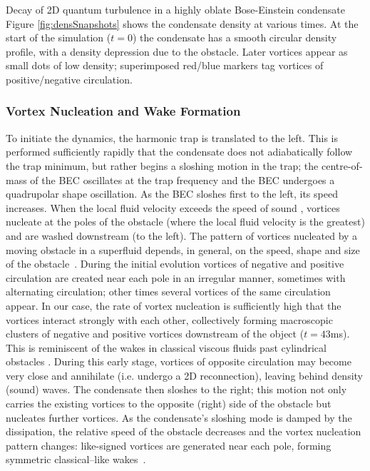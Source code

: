 \begin{chapter}{\label{cha:shin}Decay of 2D quantum turbulence in a highly oblate Bose-Einstein condensate}
Figure \ref{fig:densSnapshots} shows the condensate density at various times. At the start of the simulation ($t=0$) the condensate has a smooth circular density profile, with a density depression due to the obstacle.  Later vortices appear as small dots of low density; superimposed red/blue markers tag vortices of positive/negative circulation.

\subsubsection{Vortex Nucleation and Wake Formation}

To initiate the dynamics, the harmonic trap is translated to the left.  This is performed sufficiently rapidly that the condensate does not adiabatically follow the trap minimum, but rather begins a sloshing motion in the trap; the centre-of-mass of the BEC oscillates at the trap frequency and the BEC undergoes a quadrupolar shape oscillation.  As the BEC sloshes first to the left, its speed increases.  When the local fluid velocity exceeds the speed of sound \cite{frisch92}, vortices nucleate at the poles of the obstacle
(where the local fluid velocity is the greatest) 
and are washed downstream (to the left).  
The pattern of vortices nucleated by a moving obstacle 
in a superfluid depends, in general, on the  speed, shape and size of 
the obstacle~\citep{jma00,saito10,stagg_parker_14}. 
During the initial evolution vortices of negative
and positive circulation are created near each pole in an 
irregular manner, sometimes with alternating circulation;  
other times several vortices of the same circulation appear.  
In our case, the rate of vortex nucleation is sufficiently 
high that the vortices interact strongly with each other, 
collectively forming macroscopic clusters of negative and positive 
vortices downstream of the object ($t=43$ms).  This is reminiscent of the wakes in classical viscous fluids past cylindrical obstacles \cite{stagg_parker_14}.  
During this early stage, vortices of opposite 
circulation may become very close and annihilate (i.e. undergo 
a 2D reconnection), leaving behind density (sound) waves. The condensate then sloshes to the right; this 
motion not only carries the existing vortices to the opposite 
(right) side of the obstacle but nucleates further vortices. 
As the condensate's sloshing mode is damped by 
the dissipation, the relative speed of the obstacle decreases
and the vortex nucleation pattern changes: 
like-signed vortices are generated near each pole, 
forming symmetric classical--like wakes~\cite{stagg_parker_14}. 

\end{chapter}
